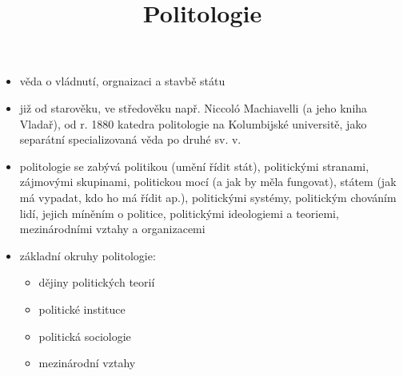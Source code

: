 \documentclass{article}
\title{\vspace{-2cm}Politologie\vspace{-1.7cm}}
\date{}
\author{}
\begin{document}
\maketitle

\begin{itemize}
  \item věda o vládnutí, orgnaizaci a stavbě státu
  \item již od starověku, ve středověku např. Niccoló Machiavelli (a jeho kniha Vladař), od r. 1880 katedra politologie na Kolumbijské universitě, jako separátní specializovaná věda po druhé sv. v.
  \item politologie se zabývá politikou (umění řídit stát), politickými stranami, zájmovými skupinami, politickou mocí (a jak by měla fungovat), státem (jak má vypadat, kdo ho má řídit ap.), politickými systémy, politickým chováním lidí, jejich míněním o politice, politickými ideologiemi a teoriemi, mezinárodními vztahy a organizacemi
  \item základní okruhy politologie:
  \begin{itemize}
    \item dějiny politických teorií
    \item politické instituce
    \item politická sociologie
    \item mezinárodní vztahy
  \end{itemize}
\end{itemize}
\end{document}
